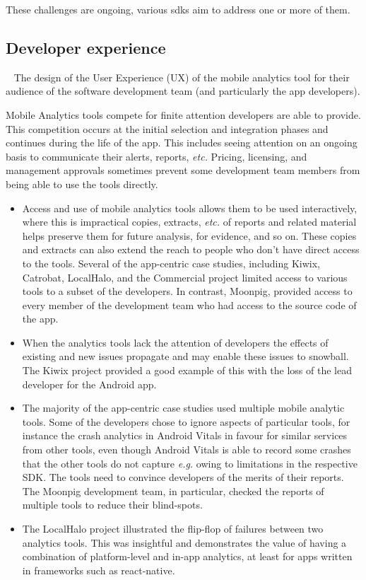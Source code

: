 These challenges are ongoing, various \Glspl{sdk} aim to address one or more of them.

\subsection{Developer experience}~\label{tata-developer-experience-ux-design}
The design of the User Experience (UX) of the mobile analytics tool for their audience of the software development team (and particularly the app developers).


Mobile Analytics tools compete for finite attention developers are able to provide. This competition occurs at the initial selection and integration phases and continues during the life of the app. This includes seeing attention on an ongoing basis  to communicate their alerts, reports, \emph{etc.} Pricing, licensing, and management approvals sometimes prevent some development team members from being able to use the tools directly.

\begin{itemize}
    \itemsep0em
    \item Access and use of mobile analytics tools allows them to be used interactively, where this is impractical copies, extracts, \emph{etc.} of reports and related material helps  preserve them for future analysis, for evidence, and so on. These copies and extracts can also extend the reach to people who don't have direct access to the tools. Several of the app-centric case studies, including Kiwix, Catrobat, LocalHalo, and the Commercial project limited access to various tools to a subset of the developers. In contrast, Moonpig, provided access to every member of the development team who had access to the source code of the app.
    \item When the analytics tools lack the attention of developers the effects of existing and new issues propagate and may enable these issues to snowball. The Kiwix project provided a good example of this with the loss of the lead developer for the Android app.
    \item The majority of the app-centric case studies used multiple mobile analytic tools. Some of the developers chose to ignore aspects of particular tools, for instance the crash analytics in Android Vitals in favour for similar services from other tools, even though Android Vitals is able to record some crashes that the other tools do not capture \emph{e.g.} owing to limitations in the respective SDK. The tools need to convince developers of the merits of their reports. The Moonpig development team, in particular, checked the reports of multiple tools to reduce their blind-spots.
    \item The LocalHalo project illustrated the flip-flop of failures between two analytics tools. This was insightful and demonstrates the value of having a combination of platform-level and in-app analytics, at least for apps written in frameworks such as react-native.
\end{itemize}

